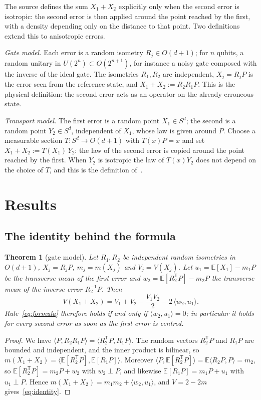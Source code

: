 \documentclass[11pt,a4paper]{article}
\newtheorem{theorem}{Theorem}
\theoremstyle{definition}
\theoremstyle{plain}
\newcommand{\E}{\mathbb{E}}
\newcommand{\T}{\mathsf{T}}
\newcommand{\ip}[2]{\langle#1,#2\rangle}
\begin{document}
The source defines the sum $X_1+X_2$ explicitly only when the second error is
isotropic: the second error is then applied around the point reached by the
first, with a density depending only on the distance to that point. Two
definitions extend this to anisotropic errors.

\emph{Gate model.} Each error is a random isometry $R_j\in O(d+1)$; for $n$
qubits, a random unitary in $U(2^n)\subset O(2^{n+1})$, for instance a noisy
gate composed with the inverse of the ideal gate. The isometries $R_1,R_2$ are
independent, $X_j=R_jP$ is the error seen from the reference state, and
$X_1+X_2:=R_2R_1P$. This is the physical definition: the second error acts as
an operator on the already erroneous state.

\emph{Transport model.} The first error is a random point $X_1\in S^d$; the
second is a random point $Y_2\in S^d$, independent of $X_1$, whose law is
given around $P$. Choose a measurable section $T:S^d\to O(d+1)$ with
$T(x)P=x$ and set $X_1+X_2:=T(X_1)\,Y_2$: the law of the second error is
copied around the point reached by the first. When $Y_2$ is isotropic the law
of $T(x)Y_2$ does not depend on the choice of $T$, and this is the definition
of~\cite{LacallePozo2019}.

\section{Results}\label{sec:results}
\subsection{The identity behind the formula}

\begin{theorem}[gate model]\label{thm:gate}
Let $R_1,R_2$ be independent random isometries in $O(d+1)$, $X_j=R_jP$,
$m_j=m(X_j)$ and $V_j=V(X_j)$. Let $u_1=\E[X_1]-m_1P$ be the transverse mean
of the first error and $w_2=\E[R_2^\T P]-m_2P$ the transverse mean of the
inverse error $R_2^{-1}P$. Then
\begin{equation}\label{eq:identity}
V(X_1+X_2)=V_1+V_2-\frac{V_1V_2}{2}-2\,\ip{w_2}{u_1}.
\end{equation}
Rule~\eqref{eq:formula} therefore holds if and only if $\ip{w_2}{u_1}=0$; in
particular it holds for every second error as soon as the first error is
centred.
\end{theorem}

\begin{proof}
We have $\ip P{R_2R_1P}=\ip{R_2^\T P}{R_1P}$. The random vectors $R_2^\T P$
and $R_1P$ are bounded and independent, and the inner product is bilinear, so
$m(X_1+X_2)=\ip{\E[R_2^\T P]}{\E[R_1P]}$. Moreover
$\ip P{\E[R_2^\T P]}=\E\ip{R_2P}P=m_2$, so $\E[R_2^\T P]=m_2P+w_2$ with
$w_2\perp P$, and likewise $\E[R_1P]=m_1P+u_1$ with $u_1\perp P$. Hence
$m(X_1+X_2)=m_1m_2+\ip{w_2}{u_1}$, and $V=2-2m$ gives~\eqref{eq:identity}.
\end{proof}
\end{document}

